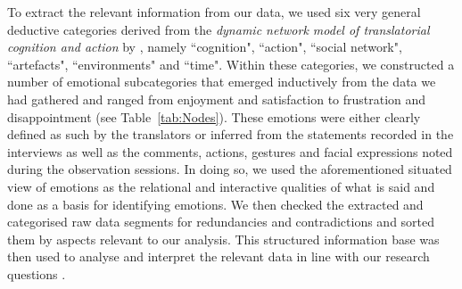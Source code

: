 \documentclass[output=paper]{langscibook}
\begin{document}
To extract the relevant information from our data, we used six very general deductive categories derived from the \textit{dynamic network model of translatorial cognition and action} by \citet{Risku2013}, namely “cognition", “action", “social network", “artefacts", “environments" and “time". Within these categories, we constructed a number of emotional subcategories that emerged inductively from the data we had gathered and ranged from enjoyment and satisfaction to frustration and disappointment (see Table~\ref{tab:Nodes}). These emotions were either clearly defined as such by the translators or inferred from the statements recorded in the interviews as well as the comments, actions, gestures and facial expressions noted during the observation sessions. In doing so, we used the aforementioned situated view of emotions as the relational and interactive qualities of what is said and done as a basis for identifying emotions. We then checked the extracted and categorised raw data segments for redundancies and contradictions and sorted them by aspects relevant to our analysis. This structured information base was then used to analyse and interpret the relevant data in line with our research questions \citep[202f]{Gläser2009}.
\end{document}
